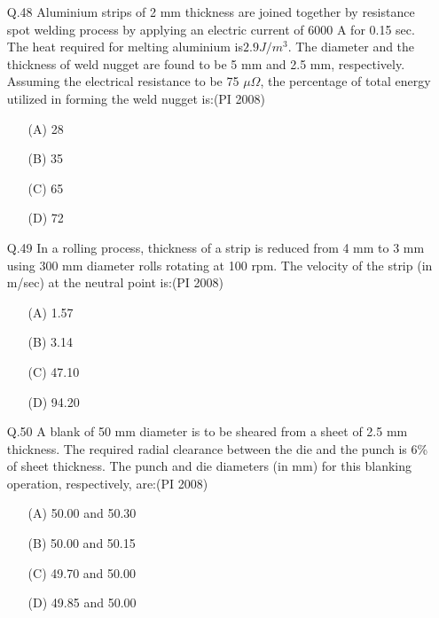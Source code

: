 \documentclass[journal,12pt,onecolumn]{IEEEtran}
\theoremstyle{remark}
\begin{document}
\begin{enumerate}
\item[\textnormal{Q.48}]
Aluminium strips of 2 mm thickness are joined together by resistance spot welding process by applying an electric current of 6000 A for 0.15 sec. The heat required for melting aluminium is$2.9J/m^3$. The diameter and the thickness of weld nugget are found to be 5 mm and 2.5 mm, respectively. Assuming the electrical resistance to be 75 $\mu\Omega$, the percentage of total energy utilized in forming the weld nugget is:\hfill{(PI 2008)}
\begin{multicols}{4}
    \begin{enumerate}[label=(\Alph*)]
  \item[(A)] 28
  \item[(B)] 35
  \item[(C)] 65
  \item[(D)] 72
\end{enumerate}
\end{multicols}
\vspace{1cm}
\item[\textnormal{Q.49}]
In a rolling process, thickness of a strip is reduced from 4 mm to 3 mm using 300 mm diameter rolls rotating at 100 rpm. The velocity of the strip (in m/sec) at the neutral point is:\hfill{(PI 2008)}
\begin{multicols}{4}
    \begin{enumerate}[label=(\Alph*)]
  \item[(A)] 1.57
  \item[(B)] 3.14
  \item[(C)] 47.10
  \item[(D)] 94.20
\end{enumerate}
\end{multicols}
\vspace{1cm}

\item[\textnormal{Q.50}]A blank of 50 mm diameter is to be sheared from a sheet of 2.5 mm thickness. The required radial clearance between the die and the punch is 6\% of sheet thickness. The punch and die diameters (in mm) for this blanking operation, respectively, are:\hfill{(PI 2008)}
\begin{multicols}{4}
    \begin{enumerate}[label=(\Alph*)]
  \item[(A)] 50.00 and 50.30
  \item[(B)] 50.00 and 50.15
  \item[(C)] 49.70 and 50.00
  \item[(D)] 49.85 and 50.00
\end{enumerate}
\end{multicols}
\vspace{1cm}


\end{enumerate}
\end{document}
